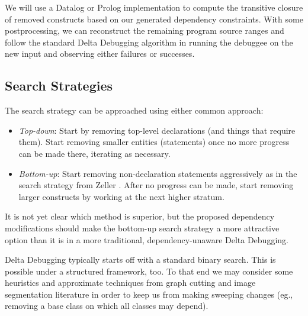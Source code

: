 \documentclass[11pt]{article}
\begin{document}
\begin{itemize}
  We will use a Datalog or Prolog implementation to compute the transitive
  closure of removed constructs based on our generated dependency constraints.
  With some postprocessing, we can reconstruct the remaining program source ranges
  and follow the standard Delta Debugging algorithm in running the debuggee on the
  new input and observing either failures or successes.

\end{itemize}

\subsection{Search Strategies}
The search strategy can be approached using either common approach:
\begin{itemize}
\item \emph{Top-down}: Start by removing top-level declarations (and things that
  require them). Start removing smaller entities (statements) once no more
  progress can be made there, iterating as necessary.
\item \emph{Bottom-up}: Start removing non-declaration statements aggressively
  as in the search strategy from Zeller \cite{dd}. After no progress can be made, start
  removing larger constructs by working at the next higher stratum.
\end{itemize}
It is not yet clear which method is superior, but the proposed dependency
modifications should make the bottom-up search strategy a more attractive
option than it is in a more traditional, dependency-unaware Delta Debugging.

Delta Debugging typically starts off with a standard binary search. This is
possible under a structured framework, too. To that end we may consider some
heuristics and approximate techniques from graph cutting and image segmentation
literature \cite{nc} in order to keep us from making sweeping changes (eg.,
removing a base class on which all classes may depend).
\end{document}
